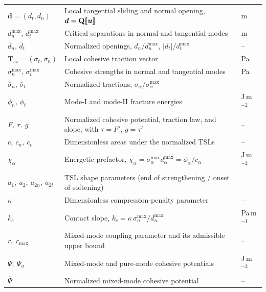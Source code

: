 \documentclass[smallextended]{svjour3}       %
\newcommand{\vb}[1]{\bm{#1}}      %
\newcommand{\mat}[1]{\mathbf{#1}}  %
\newcommand{\uu}{\vb{u}}
\DeclarePairedDelimiter{\jump}{\llbracket}{\rrbracket}
\providecommand{\bd}{\vb d}
\renewcommand{\bd}{\vb d}
\providecommand{\bTcz}{\vb{T}_{\mathrm{cz}}}
\renewcommand{\bTcz}{\vb{T}_{\mathrm{cz}}}
\begin{document}
{\begin{longtable}{@{}>{\raggedright\arraybackslash}p{}%
			>{\raggedright\arraybackslash}p{}%
			>{\raggedleft\arraybackslash}p{}@{}}
		\multicolumn{3}{@{}l@{}}{\textbf{Cohesive variables and TSL}}\\
		\midrule
		\(\bd=(d_t,d_n)\) & Local tangential sliding and normal opening, \(\bd=\mat Q\jump{\uu}\) & m\\
		\(d_n^{\max},\,d_t^{\max}\) & Critical separations in normal and tangential modes & m\\
		\(\bar d_n,\,\bar d_t\) & Normalized openings, \(d_n/d_n^{\max}\), \(|d_t|/d_t^{\max}\) & --\\
		\(\bTcz=(\sigma_t,\sigma_n)\) & Local cohesive traction vector & Pa\\
		\(\sigma_n^{\max},\,\sigma_t^{\max}\) & Cohesive strengths in normal and tangential modes & Pa\\
		\(\bar\sigma_n,\,\bar\sigma_t\) & Normalized tractions, \(\sigma_\alpha/\sigma_\alpha^{\max}\) & --\\
		\(\phi_n,\,\phi_t\) & Mode-I and mode-II fracture energies & J\,m\(^{-2}\)\\
		\(F,\ \tau,\ g\) & Normalized cohesive potential, traction law, and slope, with \(\tau=F'\), \(g=\tau'\) & --\\
		\(c,\ c_n,\ c_t\) & Dimensionless areas under the normalized TSLs & --\\
		\(\chi_\alpha\) & Energetic prefactor, \(\chi_\alpha=\sigma_\alpha^{\max}d_\alpha^{\max}=\phi_\alpha/c_\alpha\) & J\,m\(^{-2}\)\\
		\(a_1,\ a_2,\ a_{2n},\ a_{2t}\) & TSL shape parameters (end of strengthening / onset of softening) & --\\
		\(\kappa\) & Dimensionless compression-penalty parameter & --\\
		\(k_c\) & Contact slope, \(k_c=\kappa\,\sigma_n^{\max}/d_n^{\max}\) & Pa\,m\(^{-1}\)\\
		\(r,\ r_{\max}\) & Mixed-mode coupling parameter and its admissible upper bound & --\\
		\(\Psi,\ \Psi_\alpha\) & Mixed-mode and pure-mode cohesive potentials & J\,m\(^{-2}\)\\
		\(\hat\Psi\) & Normalized mixed-mode cohesive potential & --\\
		

\end{longtable}}
\end{document}
